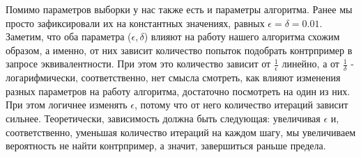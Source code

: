 Помимо параметров выборки у нас также есть и параметры алгоритма. Ранее мы просто зафиксировали их на константных значениях, равных $\epsilon = \delta = 0.01$. Заметим, что оба параметра ($\epsilon, \delta$) влияют на работу нашего алгоритма схожим образом, а именно, от них зависит количество попыток подобрать контрпример в запросе эквивалентности. При этом это количество зависит от $\frac{1}{\epsilon}$ линейно, а от $\frac{1}{\delta}$ - логарифмически, соответственно, нет смысла смотреть, как влияют изменения разных параметров на работу алгоритма, достаточно посмотреть на один из них. При этом логичнее изменять $\epsilon$, потому что от него количество итераций зависит сильнее. Теоретически, зависимость должна быть следующая: увеличивая $\epsilon$ и, соответственно, уменьшая количество итераций на каждом шагу, мы увеличиваем вероятность не найти контрпример, а значит, завершиться раньше предела.


